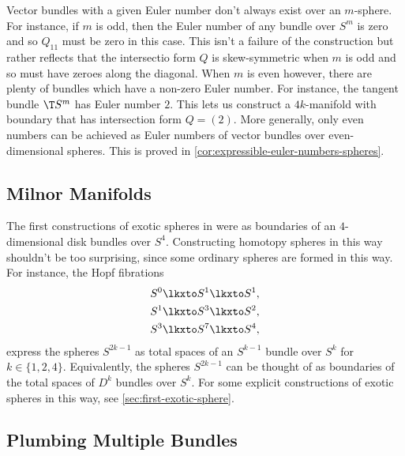 Vector bundles with a given Euler number don't always exist over an $m$-sphere. For instance, if $m$ is odd, then the Euler number of any bundle over $S^m$ is zero and so $Q_{11}$ must be zero in this case. This isn't a failure of the construction but rather reflects that the intersectio form $Q$ is skew-symmetric when $m$ is odd and so must have zeroes along the diagonal. When $m$ is even however, there are plenty of bundles which have a non-zero Euler number. For instance, the tangent bundle $\T S^m$ has Euler number $2$. This lets us construct a $4k$-manifold with boundary that has intersection form $Q = (2)$. More generally, only even numbers can be achieved as Euler numbers of vector bundles over even-dimensional spheres. This is proved in \cref{cor:expressible-euler-numbers-spheres}.

\subsection{Milnor Manifolds}

The first constructions of exotic spheres in \cite{milnor1956manifolds} were as boundaries of an $4$-dimensional disk bundles over $S^4$. 
Constructing homotopy spheres in this way shouldn't be too surprising, since some ordinary spheres are formed in this way. For instance, the Hopf fibrations
\[
	\begin{aligned}
		S^0 \lkxto S^1 \lkxto S^1, \\
		S^1 \lkxto S^3 \lkxto S^2, \\
		S^3 \lkxto S^7 \lkxto S^4, \\
	\end{aligned}
\]
express the spheres $S^{2k-1}$ as total spaces of an $S^{k-1}$ bundle over $S^k$ for $k\in\{1,2,4\}$. Equivalently, the spheres $S^{2k-1}$ can be thought of as boundaries of the total spaces of $D^k$ bundles over $S^k$. For some explicit constructions of exotic spheres in this way, see \cref{sec:first-exotic-sphere}.

\subsection{Plumbing Multiple Bundles}

